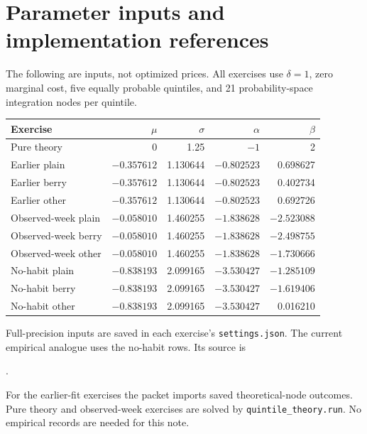 \documentclass[11pt]{article}
\begin{document}
\section{Parameter inputs and implementation references}
The following are inputs, not optimized prices. All exercises use
$\delta=1$, zero marginal cost, five equally probable quintiles, and
21 probability-space integration nodes per quintile.
\begin{center}\small
\begin{tabular}{lrrrr}\toprule
Exercise & $\mu$ & $\sigma$ & $\alpha$ & $\beta$\\\midrule
Pure theory & 0 & 1.25 & $-1$ & 2\\
Earlier plain & $-0.357612$ & 1.130644 & $-0.802523$ & 0.698627\\
Earlier berry & $-0.357612$ & 1.130644 & $-0.802523$ & 0.402734\\
Earlier other & $-0.357612$ & 1.130644 & $-0.802523$ & 0.692726\\
Observed-week plain & $-0.058010$ & 1.460255 & $-1.838628$ & $-2.523088$\\
Observed-week berry & $-0.058010$ & 1.460255 & $-1.838628$ & $-2.498755$\\
Observed-week other & $-0.058010$ & 1.460255 & $-1.838628$ & $-1.730666$\\
No-habit plain & $-0.838193$ & 2.099165 & $-3.530427$ & $-1.285109$\\
No-habit berry & $-0.838193$ & 2.099165 & $-3.530427$ & $-1.619406$\\
No-habit other & $-0.838193$ & 2.099165 & $-3.530427$ & 0.016210\\
\bottomrule\end{tabular}
\end{center}
Full-precision inputs are saved in each exercise's \texttt{settings.json}.
The current empirical analogue uses the no-habit rows. Its source is
\par{\small{}.}\par
For the earlier-fit exercises the packet imports saved theoretical-node
outcomes. Pure theory and observed-week exercises are solved by
\texttt{quintile\_theory.run}. No empirical records are needed for this note.
\end{document}
